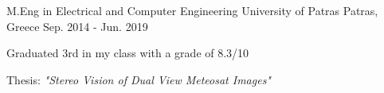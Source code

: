 

\begin{cventries}

  \cventry
    {M.Eng in Electrical and Computer Engineering} %
    {University of Patras} %
    {Patras, Greece} %
    {Sep. 2014 - Jun. 2019} %
    {
      \begin{cvitems} %
        \item {Graduated 3rd in my class with a grade of 8.3/10}
        \item {Thesis: \emph{"Stereo Vision of Dual View Meteosat Images"}}
      \end{cvitems}
    }

\end{cventries}

